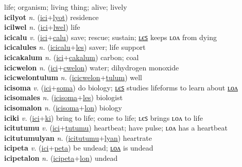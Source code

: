 life; organism; living thing; alive; lively \label{icilon} \\
\textbf{icilyot} \textit{n.} (\hyperref[ici]{ici}+\hyperref[lyot]{lyot})
residence \label{icilyot} \\
\textbf{icilwel} \textit{n.} (\hyperref[ici]{ici}+\hyperref[lwel]{lwel})
life \label{icilwel} \\
\textbf{icicalu} \textit{v.} (\hyperref[ici]{ici}+\hyperref[calu]{calu})
save; rescue; sustain; \hyperref[icicalules]{ʟєꜱ} keeps ʟᴏᴧ from dying \label{icicalu} \\
\textbf{icicalules} \textit{n.} (\hyperref[icicalu]{icicalu}+\hyperref[les]{les})
saver; life support \label{icicalules} \\
\textbf{icicakalum} \textit{n.} (\hyperref[ici]{ici}+\hyperref[cakalum]{cakalum})
carbon; coal \label{icicakalum} \\
\textbf{icicwelon} \textit{n.} (\hyperref[ici]{ici}+\hyperref[cwelon]{cwelon})
water; dihydrogen monoxide \label{icicwelon} \\
\textbf{icicwelontulum} \textit{n.} (\hyperref[icicwelon]{icicwelon}+\hyperref[tulum]{tulum})
well \label{icicwelontulum} \\
\textbf{icisoma} \textit{v.} (\hyperref[ici]{ici}+\hyperref[soma]{soma})
do biology; \hyperref[icisomales]{ʟєꜱ} studies lifeforms to learn about \hyperref[icisomalon]{ʟᴏᴧ} \label{icisoma} \\
\textbf{icisomales} \textit{n.} (\hyperref[icisoma]{icisoma}+\hyperref[les]{les})
biologist \label{icisomales} \\
\textbf{icisomalon} \textit{n.} (\hyperref[icisoma]{icisoma}+\hyperref[lon]{lon})
biology \label{icisomalon} \\
\textbf{iciki} \textit{v.} (\hyperref[ici]{ici}+\hyperref[ki]{ki})
bring to life; come to life; ʟєꜱ brings ʟᴏᴧ to life \label{iciki} \\
\textbf{icitutumu} \textit{v.} (\hyperref[ici]{ici}+\hyperref[tutumu]{tutumu})
heartbeat; have pulse; ʟᴏᴧ has a heartbeat \label{icitutumu} \\
\textbf{icitutumulyan} \textit{n.} (\hyperref[icitutumu]{icitutumu}+\hyperref[lyan]{lyan})
heartrate \label{icitutumulyan} \\
\textbf{icipeta} \textit{v.} (\hyperref[ici]{ici}+\hyperref[peta]{peta})
be undead; \hyperref[icipetalon]{ʟᴏᴧ} is undead \label{icipeta} \\
\textbf{icipetalon} \textit{n.} (\hyperref[icipeta]{icipeta}+\hyperref[lon]{lon})
undead \label{icipetalon} \\
